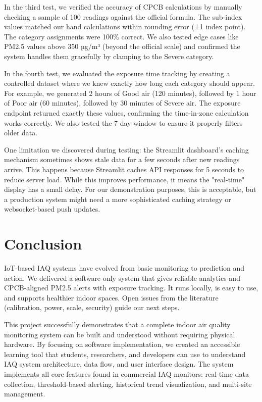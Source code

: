 \documentclass[12pt]{report}
\begin{document}
In the third test, we verified the accuracy of CPCB calculations by manually checking a sample of 100 readings against the official formula. The sub-index values matched our hand calculations within rounding error (±1 index point). The category assignments were 100\% correct. We also tested edge cases like PM2.5 values above 350 µg/m³ (beyond the official scale) and confirmed the system handles them gracefully by clamping to the Severe category.

In the fourth test, we evaluated the exposure time tracking by creating a controlled dataset where we knew exactly how long each category should appear. For example, we generated 2 hours of Good air (120 minutes), followed by 1 hour of Poor air (60 minutes), followed by 30 minutes of Severe air. The exposure endpoint returned exactly these values, confirming the time-in-zone calculation works correctly. We also tested the 7-day window to ensure it properly filters older data.

One limitation we discovered during testing: the Streamlit dashboard's caching mechanism sometimes shows stale data for a few seconds after new readings arrive. This happens because Streamlit caches API responses for 5 seconds to reduce server load. While this improves performance, it means the "real-time" display has a small delay. For our demonstration purposes, this is acceptable, but a production system might need a more sophisticated caching strategy or websocket-based push updates.

\section{Conclusion}
IoT-based IAQ systems have evolved from basic monitoring to prediction and action. We delivered a software-only system that gives reliable analytics and CPCB-aligned PM2.5 alerts with exposure tracking. It runs locally, is easy to use, and supports healthier indoor spaces. Open issues from the literature (calibration, power, scale, security) guide our next steps.

This project successfully demonstrates that a complete indoor air quality monitoring system can be built and understood without requiring physical hardware. By focusing on software implementation, we created an accessible learning tool that students, researchers, and developers can use to understand IAQ system architecture, data flow, and user interface design. The system implements all core features found in commercial IAQ monitors: real-time data collection, threshold-based alerting, historical trend visualization, and multi-site management.
\end{document}
